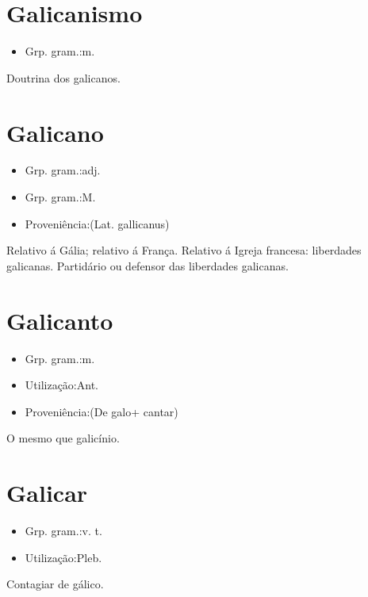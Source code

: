 \section{Galicanismo}
\begin{itemize}
\item {Grp. gram.:m.}
\end{itemize}
Doutrina dos galicanos.
\section{Galicano}
\begin{itemize}
\item {Grp. gram.:adj.}
\end{itemize}
\begin{itemize}
\item {Grp. gram.:M.}
\end{itemize}
\begin{itemize}
\item {Proveniência:(Lat. \textunderscore gallicanus\textunderscore )}
\end{itemize}
Relativo á Gália; relativo á França.
Relativo á Igreja francesa: \textunderscore liberdades galicanas\textunderscore .
Partidário ou defensor das liberdades galicanas.
\section{Galicanto}
\begin{itemize}
\item {Grp. gram.:m.}
\end{itemize}
\begin{itemize}
\item {Utilização:Ant.}
\end{itemize}
\begin{itemize}
\item {Proveniência:(De \textunderscore galo\textunderscore  + \textunderscore cantar\textunderscore )}
\end{itemize}
O mesmo que \textunderscore galicínio\textunderscore .
\section{Galicar}
\begin{itemize}
\item {Grp. gram.:v. t.}
\end{itemize}
\begin{itemize}
\item {Utilização:Pleb.}
\end{itemize}
Contagiar de gálico.
